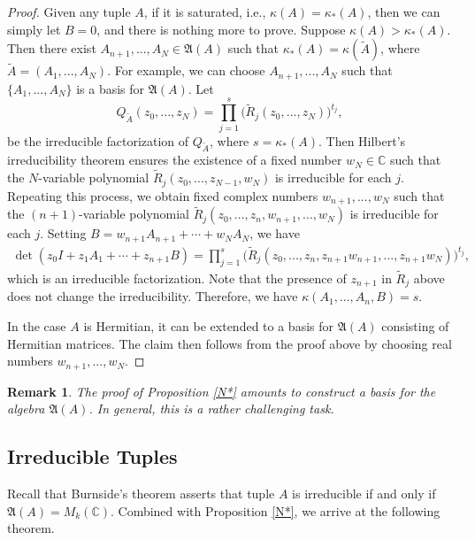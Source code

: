 \documentclass[draft, 12pt, reqno]{amsart}
\newcommand{\C}{{\mathbb C}}
\numberwithin{equation}{section}
\theoremstyle{plain}
\newtheorem{remark}[theorem]{Remark}
\begin{document}
\begin{proof}
Given any tuple $A$, if it is saturated, i.e., $\kappa (A)=\kappa_*(A)$, then we can simply let $B=0$, and there is nothing more to prove. Suppose $\kappa (A)>\kappa_*(A)$. Then there exist $A_{n+1}, ..., A_N\in \mathfrak{A}(A)$ such that $\kappa_*(A)=\kappa (\widetilde{A})$, where $\widetilde{A}=(A_1, ..., A_N)$. For example, we can choose $A_{n+1}, ..., A_N$ such that $\{A_1, ..., A_N\}$ is a basis for $\mathfrak{A}(A)$. Let
\[Q_{\widetilde{A}}(z_0, ..., z_N)=\prod_{j=1}^s\big(\widetilde{R}_j(z_0, ..., z_N)\big)^{t_j},\]
be the irreducible factorization of $Q_{\widetilde{A}}$, where $s=\kappa_*(A)$. Then Hilbert's irreducibility theorem ensures the existence of a fixed number $w_N\in \C$ such that the $N$-variable polynomial $\widetilde{R}_j(z_0, ..., z_{N-1},w_N)$ is irreducible for each $j$. Repeating this process, we obtain fixed complex numbers $w_{n+1}, ..., w_N$ such that the $(n+1)$-variable polynomial $\widetilde{R}_j(z_0, ..., z_n, w_{n+1}, ...,w_N)$ is irreducible for each $j$. Setting $B=w_{n+1}A_{n+1}+\cdots +w_NA_N$, we have
\begin{align*}
    \det(z_0I+z_1A_1+\cdots +z_{n+1}B)=\prod_{j=1}^s\big(\widetilde{R}_j(z_0, ...,z_n, z_{n+1}w_{n+1}, ..., z_{n+1}w_N)\big)^{t_j},\end{align*}
which is an irreducible factorization. Note that the presence of $z_{n+1}$ in $\widetilde{R}_j$ above does not change the irreducibility. Therefore, we have $\kappa (A_1, ..., A_n, B)=s$. 

In the case $A$ is Hermitian, it can be extended to a basis for $\mathfrak{A}(A)$ consisting of Hermitian matrices. The claim then follows from the proof above by choosing real numbers $w_{n+1}, ..., w_{N}$.
\end{proof}

\vspace{.1cm}

\begin{remark}\label{AM1} \normalfont The proof of Proposition \ref{N*} amounts to construct a basis for the algebra $\mathfrak{A}(A)$. In general, this is a rather challenging task. 
\end{remark}


\subsection{Irreducible Tuples} Recall that Burnside's theorem asserts that tuple $A$ is irreducible if and only if ${\mathfrak A}(A)=M_k(\C)$. Combined with Proposition \ref{N*}, we arrive at the following theorem.
\end{document}
